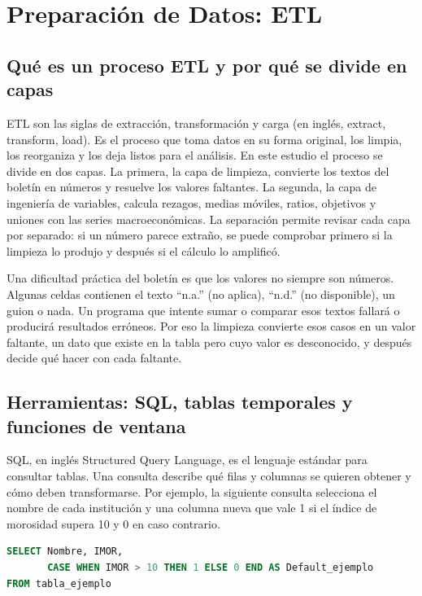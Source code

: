 \section{Preparación de Datos: ETL}

\subsection{Qué es un proceso ETL y por qué se divide en capas}
ETL son las siglas de extracción, transformación y carga (en inglés, extract, transform, load). Es el proceso que toma datos en su forma original, los limpia, los reorganiza y los deja listos para el análisis. En este estudio el proceso se divide en dos capas. La primera, la capa de limpieza, convierte los textos del boletín en números y resuelve los valores faltantes. La segunda, la capa de ingeniería de variables, calcula rezagos, medias móviles, ratios, objetivos y uniones con las series macroeconómicas. La separación permite revisar cada capa por separado: si un número parece extraño, se puede comprobar primero si la limpieza lo produjo y después si el cálculo lo amplificó.

Una dificultad práctica del boletín es que los valores no siempre son números. Algunas celdas contienen el texto ``n.a.'' (no aplica), ``n.d.'' (no disponible), un guion o nada. Un programa que intente sumar o comparar esos textos fallará o producirá resultados erróneos. Por eso la limpieza convierte esos casos en un valor faltante, un dato que existe en la tabla pero cuyo valor es desconocido, y después decide qué hacer con cada faltante.

\subsection{Herramientas: SQL, tablas temporales y funciones de ventana}
SQL, en inglés Structured Query Language, es el lenguaje estándar para consultar tablas. Una consulta describe qué filas y columnas se quieren obtener y cómo deben transformarse. Por ejemplo, la siguiente consulta selecciona el nombre de cada institución y una columna nueva que vale 1 si el índice de morosidad supera 10 y 0 en caso contrario.

\begin{lstlisting}[language=SQL, caption={Ejemplo mínimo de consulta SQL con una expresión CASE}, label={lst:met_sql_case}]
SELECT Nombre, IMOR,
       CASE WHEN IMOR > 10 THEN 1 ELSE 0 END AS Default_ejemplo
FROM tabla_ejemplo
\end{lstlisting}

